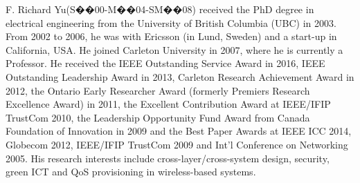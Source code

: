 \documentclass[twocolumn,10pt]{IEEEtran}
\begin{document}
\begin{IEEEbiography}{F. Richard Yu}(S��00-M��04-SM��08) received the PhD degree in electrical engineering from the University of British Columbia (UBC) in 2003. From 2002 to 2006, he was with Ericsson (in Lund, Sweden) and a start-up in California, USA. He joined Carleton University in 2007, where he is currently a Professor. He received the IEEE Outstanding Service Award in 2016, IEEE Outstanding Leadership Award in 2013, Carleton Research Achievement Award in 2012, the Ontario Early Researcher Award (formerly Premiers Research Excellence Award) in 2011, the Excellent Contribution Award at IEEE/IFIP TrustCom 2010, the Leadership Opportunity Fund Award from Canada Foundation of Innovation in 2009 and the Best Paper Awards at IEEE ICC 2014, Globecom 2012, IEEE/IFIP TrustCom 2009 and Int'l Conference on Networking 2005. His research interests include cross-layer/cross-system design, security, green ICT and QoS provisioning in wireless-based systems.


\end{IEEEbiography}
\end{document}

